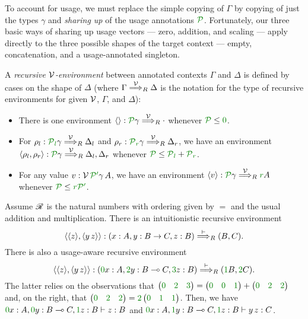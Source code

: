 To account for usage, we must replace the simple copying of $\Gamma$ by
copying of just the types $\gamma$ and \emph{sharing up} of the usage
annotations $\grP$.
Fortunately, our three basic ways of sharing up usage vectors --- zero,
addition, and scaling --- apply directly to the three possible shapes of the
target context --- empty, concatenation, and a usage-annotated singleton.

\begin{definition}\label{def:lr-rec-env}
  A \emph{recursive $\mathcal V$-environment} between annotated contexts $\Gamma$ and
  $\Delta$ is defined by cases on the shape of $\Delta$ (where
  $\Gamma \stackrel{\mathcal V}\Longrightarrow_R \Delta$ is the notation for the
  type of recursive environments for given $\mathcal V$, $\Gamma$, and $\Delta$):
  \begin{itemize}
    \item There is one environment $\alr{} : \grP\gamma \env\V_R {\cdot}$
      whenever $\grP \leq \gr0$.
    \item For $\rho_l : \grPl\gamma \env\V_R \Delta_l$ and
      $\rho_r : \grPr\gamma \env\V_R \Delta_r$, we have an environment
      $\alr{\rho_l, \rho_r} : \grP\gamma \env\V_R \Delta_l, \Delta_r$ whenever
      $\grP \leq \grPl + \grPr$.
    \item For any value $v : \V\,\grPprime\gamma\,A$, we have an environment
      $\alr{v} : \grP\gamma \env\V_R \gr rA$ whenever
      $\grP \leq \gr r\grPprime$.
  \end{itemize}
\end{definition}

\begin{example}
  Assume $\mathscr R$ is the natural numbers with ordering given by $=$ and the usual
  addition and multiplication.
  There is an intuitionistic recursive environment
  \[
    \alr{\alr{z},\alr{y\,z}} :
    \plr{x : A, y : B \to C, z : B} \env\vdash_R \plr{B, C}.
  \]
  There is also a usage-aware recursive environment
  \[
    \alr{\alr{z},\alr{y\,z}} :
    \plr{\gr0x : A, \gr2y : B \multimap C, \gr3z : B} \env\vdash_R
    \plr{\gr1B, \gr2C}.
  \]
  The latter relies on the observations that
  $\begin{pmatrix} \gr0 & \gr2 & \gr3 \end{pmatrix} =
  \begin{pmatrix} \gr0 & \gr0 & \gr1 \end{pmatrix}
  + \begin{pmatrix} \gr0 & \gr2 & \gr2 \end{pmatrix}$ and, on the right, that
  $\begin{pmatrix} \gr0 & \gr2 & \gr2 \end{pmatrix} =
  \gr2\begin{pmatrix} \gr0 & \gr1 & \gr1 \end{pmatrix}$.
  Then, we have $\gr0x : A, \gr0y : B \multimap C, \gr1z : B \vdash z : B$ and
  $\gr0x : A, \gr1y : B \multimap C, \gr1z : B \vdash y\,z : C$.
\end{example}


